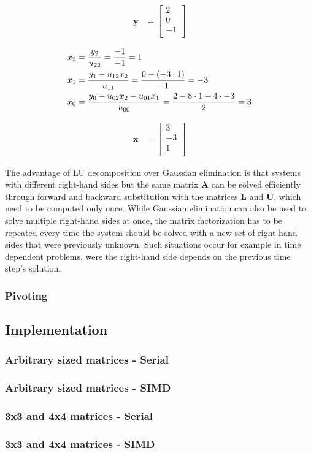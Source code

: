 \begin{align*}
\mathbf{y} 
& =
\begin{bmatrix}
2\\
0\\
-1\\
\end{bmatrix}
\end{align*}

\begin{align*}
x_2 &= \frac{y_2}{u_{22}} = \frac{-1}{-1}= 1\\
x_1 &= \frac{y_1 - u_{12}x_2}{u_{11}} = \frac{0 - \left(-3 \cdot 1\right)}{-1} = -3\\
x_0 &= \frac{y_0 - u_{02}x_2 - u_{01}x_1}{u_{00}} = \frac{2 - 8 \cdot 1 - 4 \cdot -3}{2} =  3
\end{align*}

\begin{align*}
\mathbf{x} 
& =
\begin{bmatrix}
3\\
-3\\
1\\
\end{bmatrix}
\end{align*}

The advantage of LU decomposition over Gaussian elimination is that systems with different right-hand sides but the same matrix $\mathbf{A}$ can be solved efficiently through forward and backward substitution with the matrices $\mathbf{L}$ and $\mathbf{U}$, which need to be computed only once. 
While Gaussian elimination can also be used to solve multiple right-hand sides at once, the matrix factorization has to be repeated every time the system should be solved with a new set of right-hand sides that were previously unknown.
Such situations occur for example in time dependent problems, were the right-hand side depends on the previous time step's solution.

\subsubsection{Pivoting}

\subsection{Implementation}
\subsubsection{Arbitrary sized matrices - Serial}
\subsubsection{Arbitrary sized matrices - SIMD}
\subsubsection{3x3 and 4x4 matrices - Serial}
\subsubsection{3x3 and 4x4 matrices - SIMD}